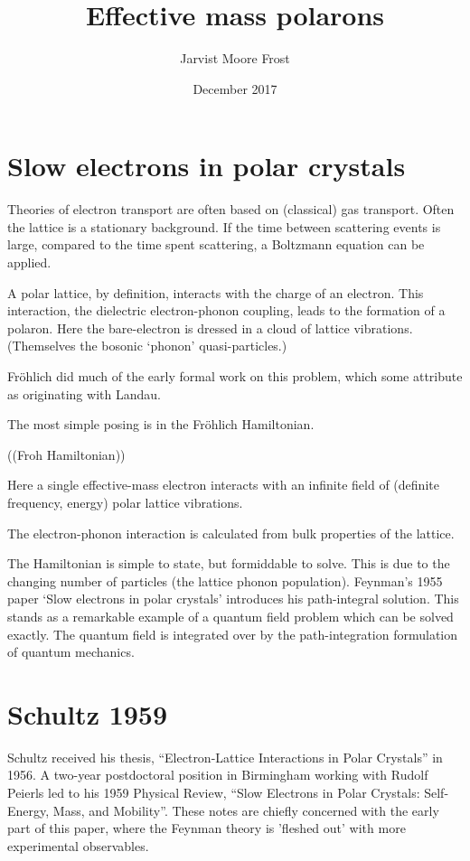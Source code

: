 \documentclass[twocolumn,11pt]{article}
\title{Effective mass polarons}
\author{Jarvist Moore Frost}
\date{December 2017}
\begin{document}
\maketitle

\section{Slow electrons in polar crystals}

Theories of electron transport are often based on (classical) gas transport. 
Often the lattice is a stationary background. 
If the time between scattering events is large, compared to the time spent
scattering, a Boltzmann equation can be applied.

A polar lattice, by definition, interacts with the charge of an electron. 
This interaction, the dielectric electron-phonon coupling, leads to the
formation of a polaron. 
Here the bare-electron is dressed in a cloud of lattice vibrations. 
(Themselves the bosonic `phonon' quasi-particles.) 

Fr\"ohlich did much of the early formal work on this problem, which some
attribute as originating with Landau. 

The most simple posing is in the Fr\"ohlich Hamiltonian.

((Froh Hamiltonian))

Here a single effective-mass electron interacts with an infinite field of
(definite frequency, energy) polar lattice vibrations. 

The electron-phonon interaction is calculated from bulk properties of the
lattice.

The Hamiltonian is simple to state, but formiddable to solve. 
This is due to the changing number of particles (the lattice phonon
population). 
Feynman's 1955 paper `Slow electrons in polar crystals'\cite{Feynman1955}
introduces his path-integral solution. 
This stands as a remarkable example of a quantum field problem which can be
solved exactly. 
The quantum field is integrated over by the path-integration formulation of
quantum mechanics. 

\section{Schultz 1959}

Schultz\cite{Fowler2005} received his thesis, ``Electron-Lattice Interactions in
Polar Crystals'' in 1956. 
A two-year postdoctoral position in Birmingham working with Rudolf Peierls led
to his 1959 Physical Review, 
``Slow Electrons in Polar Crystals: Self-Energy, Mass, and
Mobility''\cite{Schultz1959}.  
These notes are chiefly concerned with the early part of this paper, where the
Feynman theory is 'fleshed out' with more experimental observables. 
\end{document}
